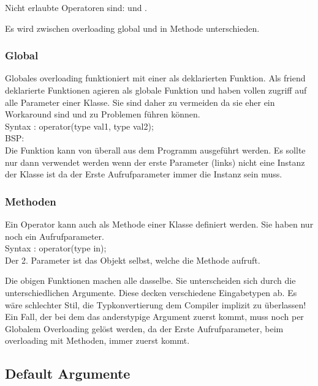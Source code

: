 Nicht erlaubte Operatoren sind:   \say{::} und .

Es wird zwischen overloading global und in Methode unterschieden.

\subsubsection{Global}

Globales overloading funktioniert mit einer als  deklarierten Funktion. 
Als friend deklarierte Funktionen agieren als globale Funktion und haben vollen zugriff auf alle Parameter einer Klasse. 
Sie sind daher zu vermeiden da sie eher ein Workaround sind und zu Problemen führen können.\\ 

Syntax :  operator(type val1, type val2);\\
BSP:\\



Die Funktion kann von überall aus dem Programm ausgeführt werden. 
Es sollte nur dann verwendet werden wenn der erste Parameter (links) nicht eine Instanz der Klasse ist da der Erste Aufrufparameter immer die Instanz sein muss.  

\subsubsection{Methoden}

Ein Operator kann auch als Methode einer Klasse definiert werden. 
Sie haben nur noch ein Aufrufparameter.\\
Syntax :  operator(type in);\\
Der 2. Parameter ist das Objekt selbst, welche die Methode aufruft.



Die obigen Funktionen machen alle dasselbe. 
Sie unterscheiden sich durch die unterschiedlichen Argumente. 
Diese decken verschiedene Eingabetypen ab. 
Es wäre schlechter Stil, die Typkonvertierung dem Compiler implizit zu überlassen! 
Ein Fall, der bei dem das anderstypige Argument zuerst kommt, muss noch per Globalem Overloading gelöst werden, da der Erste Aufrufparameter, beim overloading mit Methoden, immer zuerst kommt. 
 
\subsection{Default Argumente}

